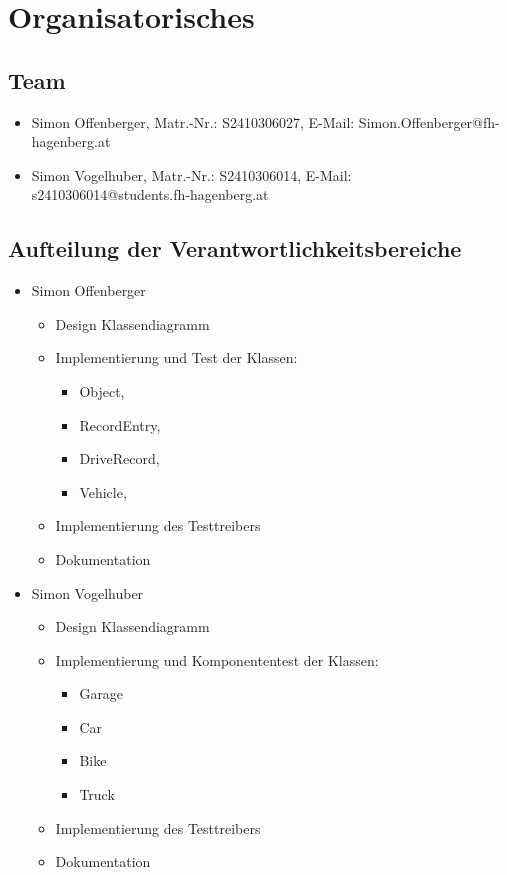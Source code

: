 \documentclass[12pt,naustrian,a4widepaper]{scrartcl}
\begin{document}
\section{Organisatorisches}

\subsection{Team}
\begin{itemize}
	\item Simon Offenberger, Matr.-Nr.: S2410306027, E-Mail: Simon.Offenberger@fh-hagenberg.at
	\item Simon Vogelhuber, Matr.-Nr.: S2410306014, E-Mail: s2410306014@students.fh-hagenberg.at	
\end{itemize}

\subsection{Aufteilung der Verantwortlichkeitsbereiche}
\begin{itemize}
	\item Simon Offenberger
		\begin{itemize}
			\item Design Klassendiagramm
			\item Implementierung und Test der Klassen: 
			\begin{itemize}
				\item Object,
				\item RecordEntry, 
				\item DriveRecord,
				\item Vehicle,
			\end{itemize}
			\item Implementierung des Testtreibers
			\item Dokumentation
		\end{itemize}
	\item Simon Vogelhuber
		\begin{itemize}
			\item Design Klassendiagramm
			\item Implementierung und Komponententest der Klassen: 
			\begin{itemize}
				\item Garage
				\item Car
				\item Bike  
				\item Truck 
			\end{itemize}
			\item Implementierung des Testtreibers
			\item Dokumentation
		\end{itemize}	
\end{itemize}
\end{document}
